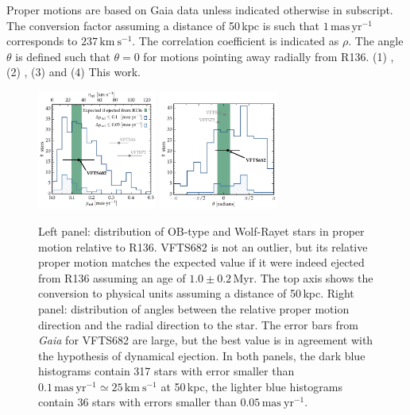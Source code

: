 \documentclass[apjl,twocolumn]{emulateapj}
\newcommand{\kms}{{\,\mathrm{km\ s^{-1}}}}
\newcommand{\masyr}{\,\mathrm{mas}\,\mathrm{yr}^{-1}}
\DeclareRobustCommand{\Secref}[1]{Sec.~\ref{#1}}
\begin{document}
\begin{table}
\begin{center}
\begin{tabular}{llc|c|c}
      \hline

    \end{tabular}
    \tablecomments
    { Proper motions are based on Gaia data unless indicated otherwise in subscript.    The conversion factor assuming a distance of 50\,kpc is such that $1\masyr$ corresponds to $237\kms$.  The correlation coefficient is indicated as $\rho$. The angle $\theta$ is defined such that $\theta=0$ for motions pointing away radially from R136.
    (1) \cite{brown:18}, 
    (2) \cite{lennon:18}, 
    (3) \cite{platais:18} and
    (4) {\color{blue}This work}.
    }
  \end{center}
  \label{tab:vfts682}
\end{table}



\begin{figure}[htbp]
  \centering
  \includegraphics[width=0.35\textwidth]{figures/dist_mu_region.pdf}
  \includegraphics[width=0.35\textwidth]{figures/angle}
  \caption{Left panel: distribution of OB-type and Wolf-Rayet stars in proper
    motion relative to R136. VFTS682 is not an outlier, but
    its relative proper motion matches the expected value if it were indeed
    ejected from R136 assuming an age of $1.0\pm0.2$\,Myr. The top axis shows the conversion to physical units
    assuming a distance of 50\,kpc. Right panel:  distribution of
    angles between the relative proper motion direction and the radial
    direction to the star. The error bars from \emph{Gaia} for VFTS682 are large, but
    the best value is in agreement with the hypothesis of dynamical
    ejection. In both
    panels, the dark blue histograms contain 317 
    stars with error smaller than $0.1\,\mathrm{mas \
      yr^{-1}}\simeq25\,\mathrm{km\ s^{-1}}$ at 50\,kpc, the
    lighter blue histograms contain 36 stars with errors smaller than $0.05\,\mathrm{mas \
      yr^{-1}}$.}
  \label{fig:mu_dist}
\end{figure}
\end{document}
